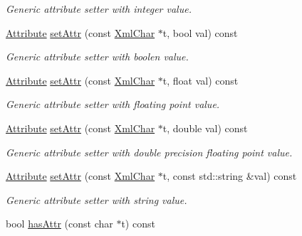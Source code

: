 \begin{DoxyCompactItemize}
\begin{DoxyCompactList}\small\item\em Generic attribute setter with integer value. \end{DoxyCompactList}\item 
\hyperlink{namespace_d_d4hep_1_1_x_m_l_a5c19b7116be99d69b4b22d911357baaf}{Attribute} \hyperlink{class_d_d4hep_1_1_x_m_l_1_1_handle__t_ab38aeee31ce22932a68b908ee6999c24}{set\+Attr} (const \hyperlink{namespace_d_d4hep_1_1_x_m_l_a09e5d9cc86ed782f6826dfe0778c1815}{Xml\+Char} $\ast$t, bool val) const
\begin{DoxyCompactList}\small\item\em Generic attribute setter with boolen value. \end{DoxyCompactList}\item 
\hyperlink{namespace_d_d4hep_1_1_x_m_l_a5c19b7116be99d69b4b22d911357baaf}{Attribute} \hyperlink{class_d_d4hep_1_1_x_m_l_1_1_handle__t_a10e2e208eaa4ab12b486a62deb27cddf}{set\+Attr} (const \hyperlink{namespace_d_d4hep_1_1_x_m_l_a09e5d9cc86ed782f6826dfe0778c1815}{Xml\+Char} $\ast$t, float val) const
\begin{DoxyCompactList}\small\item\em Generic attribute setter with floating point value. \end{DoxyCompactList}\item 
\hyperlink{namespace_d_d4hep_1_1_x_m_l_a5c19b7116be99d69b4b22d911357baaf}{Attribute} \hyperlink{class_d_d4hep_1_1_x_m_l_1_1_handle__t_a8c25de0cc872ede2fa3332ce0a5aa20b}{set\+Attr} (const \hyperlink{namespace_d_d4hep_1_1_x_m_l_a09e5d9cc86ed782f6826dfe0778c1815}{Xml\+Char} $\ast$t, double val) const
\begin{DoxyCompactList}\small\item\em Generic attribute setter with double precision floating point value. \end{DoxyCompactList}\item 
\hyperlink{namespace_d_d4hep_1_1_x_m_l_a5c19b7116be99d69b4b22d911357baaf}{Attribute} \hyperlink{class_d_d4hep_1_1_x_m_l_1_1_handle__t_a6b79123e1e42a75a6e258c8e296ffd18}{set\+Attr} (const \hyperlink{namespace_d_d4hep_1_1_x_m_l_a09e5d9cc86ed782f6826dfe0778c1815}{Xml\+Char} $\ast$t, const std\+::string \&val) const
\begin{DoxyCompactList}\small\item\em Generic attribute setter with string value. \end{DoxyCompactList}\item 
bool \hyperlink{class_d_d4hep_1_1_x_m_l_1_1_handle__t_a6ba9a8fa98b3287b335fa0ef28a90ff7}{has\+Attr} (const char $\ast$t) const

\end{DoxyCompactItemize}
